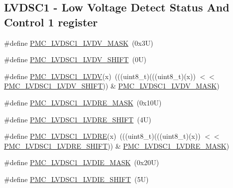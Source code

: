 \subsection*{L\+V\+D\+S\+C1 -\/ Low Voltage Detect Status And Control 1 register}
\begin{DoxyCompactItemize}
\item 
\#define \mbox{\hyperlink{group___p_m_c___register___masks_ga777eada2a526d88569a30323e9d3e1d3}{P\+M\+C\+\_\+\+L\+V\+D\+S\+C1\+\_\+\+L\+V\+D\+V\+\_\+\+M\+A\+SK}}~(0x3\+U)
\item 
\#define \mbox{\hyperlink{group___p_m_c___register___masks_gaaf45daa6de387f93bc57f1218ab17a16}{P\+M\+C\+\_\+\+L\+V\+D\+S\+C1\+\_\+\+L\+V\+D\+V\+\_\+\+S\+H\+I\+FT}}~(0\+U)
\item 
\#define \mbox{\hyperlink{group___p_m_c___register___masks_gae2cf4048ec29cc1a54349d8bc18e27e4}{P\+M\+C\+\_\+\+L\+V\+D\+S\+C1\+\_\+\+L\+V\+DV}}(x)~(((uint8\+\_\+t)(((uint8\+\_\+t)(x)) $<$$<$ \mbox{\hyperlink{group___p_m_c___register___masks_gaaf45daa6de387f93bc57f1218ab17a16}{P\+M\+C\+\_\+\+L\+V\+D\+S\+C1\+\_\+\+L\+V\+D\+V\+\_\+\+S\+H\+I\+FT}})) \& \mbox{\hyperlink{group___p_m_c___register___masks_ga777eada2a526d88569a30323e9d3e1d3}{P\+M\+C\+\_\+\+L\+V\+D\+S\+C1\+\_\+\+L\+V\+D\+V\+\_\+\+M\+A\+SK}})
\item 
\#define \mbox{\hyperlink{group___p_m_c___register___masks_gad771f87e373907e3ef60e5fa31001fad}{P\+M\+C\+\_\+\+L\+V\+D\+S\+C1\+\_\+\+L\+V\+D\+R\+E\+\_\+\+M\+A\+SK}}~(0x10\+U)
\item 
\#define \mbox{\hyperlink{group___p_m_c___register___masks_ga056ca878a20782f5bf65b3be3e98581d}{P\+M\+C\+\_\+\+L\+V\+D\+S\+C1\+\_\+\+L\+V\+D\+R\+E\+\_\+\+S\+H\+I\+FT}}~(4\+U)
\item 
\#define \mbox{\hyperlink{group___p_m_c___register___masks_ga5cb39f8534fc256799aa9e495b5f449d}{P\+M\+C\+\_\+\+L\+V\+D\+S\+C1\+\_\+\+L\+V\+D\+RE}}(x)~(((uint8\+\_\+t)(((uint8\+\_\+t)(x)) $<$$<$ \mbox{\hyperlink{group___p_m_c___register___masks_ga056ca878a20782f5bf65b3be3e98581d}{P\+M\+C\+\_\+\+L\+V\+D\+S\+C1\+\_\+\+L\+V\+D\+R\+E\+\_\+\+S\+H\+I\+FT}})) \& \mbox{\hyperlink{group___p_m_c___register___masks_gad771f87e373907e3ef60e5fa31001fad}{P\+M\+C\+\_\+\+L\+V\+D\+S\+C1\+\_\+\+L\+V\+D\+R\+E\+\_\+\+M\+A\+SK}})
\item 
\#define \mbox{\hyperlink{group___p_m_c___register___masks_ga1e7518c88ea0037d099124a643788363}{P\+M\+C\+\_\+\+L\+V\+D\+S\+C1\+\_\+\+L\+V\+D\+I\+E\+\_\+\+M\+A\+SK}}~(0x20\+U)
\item 
\#define \mbox{\hyperlink{group___p_m_c___register___masks_ga30ca240c9254a7e76123a3cf2bfdc40e}{P\+M\+C\+\_\+\+L\+V\+D\+S\+C1\+\_\+\+L\+V\+D\+I\+E\+\_\+\+S\+H\+I\+FT}}~(5\+U)

\end{DoxyCompactItemize}
